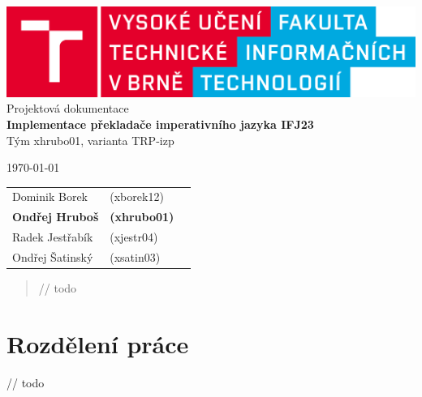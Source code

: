 \documentclass[12pt]{article}
\begin{document}
    \begin{titlepage}
        \begin{center}
            \includegraphics[width=0.77\linewidth]{img/fit_logo.png} \\
            \Huge{Projektová dokumentace} \\
            \Large{\textbf{Implementace překladače imperativního jazyka IFJ23}} \\
            \Large{Tým xhrubo01, varianta TRP-izp} \\ 
        \end{center}
        \begin{minipage}{0.4 \textwidth}
			{\Large \today}
		\end{minipage}
		\hfill
		\begin{minipage}[r]{0.6 \textwidth}
			\normalsize
            \begin{flushright}
                \begin{tabular}{l l l}
    				Dominik Borek & (xborek12)\\
    				\textbf{Ondřej Hruboš} & \textbf{(xhrubo01)} \\
    				Radek Jestřabík & (xjestr04)  \\
    				Ondřej Šatinský & (xsatin03)  \\
    			\end{tabular}
            \end{flushright}
		\end{minipage}
    \end{titlepage}

\begin{abstract}
	// todo
\end{abstract}

\section{Rozdělení práce}
// todo
\end{document}
